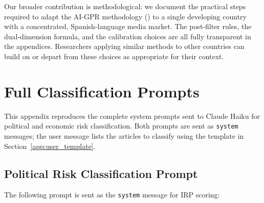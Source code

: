 \documentclass[12pt,a4paper]{article}
\begin{document}
Our broader contribution is methodological: we document the practical steps
required to adapt the AI-GPR methodology (\citealt{iacoviello2026}) to a
single developing country with a concentrated, Spanish-language media
market.  The post-filter rules, the dual-dimension formula, and the
calibration choices are all fully transparent in the appendices.
Researchers applying similar methods to other countries can build on
or depart from these choices as appropriate for their context.


\clearpage




\clearpage
\appendix
{}

\section{Full Classification Prompts}
\label{app:prompts}

This appendix reproduces the complete system prompts sent to Claude Haiku
for political and economic risk classification.  Both prompts are sent as
\texttt{system} messages; the user message lists the articles to classify
using the template in Section~\ref{app:user_template}.

\subsection*{Political Risk Classification Prompt}

The following prompt is sent as the \texttt{system} message for IRP scoring:
\end{document}
